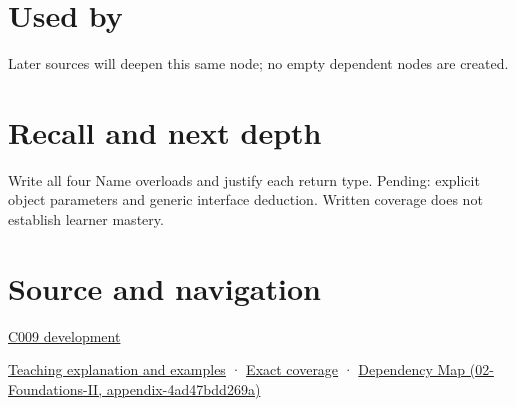 \section{Used by}\label{appendix-d42039b1d6f7-used-by}

Later sources will deepen this same node; no empty dependent nodes are created.

\section{Recall and next depth}\label{appendix-d42039b1d6f7-recall-and-next-depth}

Write all four Name overloads and justify each return type. Pending: explicit object parameters and generic interface deduction. Written coverage does not establish learner mastery.

\section{Source and navigation}\label{appendix-d42039b1d6f7-source-and-navigation}

\hyperref[appendix-fd090d982a15-m009---parts-127-147]{C009 development}

\href{Continuous\%20Notes/Computing\%20Foundations\%20-\%20From\%20Bits\%20to\%20C++\%20and\%20Systems\%20APIs\#An\%20accessor\%20must\%20respect\%20the\%20caller's\%20lifetime}{Teaching explanation and examples} · \hyperref[appendix-fd090d982a15-m008---parts-113-126]{Exact coverage} · \href{../02-Foundations-II/main.pdf\#nameddest=appendix-4ad47bdd269a}{Dependency Map (02-Foundations-II, appendix-4ad47bdd269a)}

